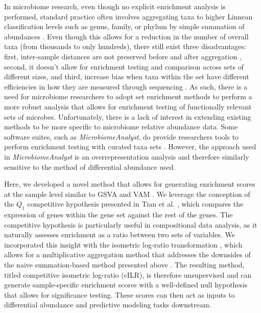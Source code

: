 \documentclass{article}
\begin{document}
In microbiome research, even though no explicit enrichment analysis is performed, standard practice often involves aggregating taxa to higher Linnean classification levels such as genus, family, or phylum by simple summation of abundances \cite{mclaren2019}. Even though this allows for a reduction in the number of overall taxa (from thousands to only hundreds), there still exist three disadvantages: first, inter-sample distances are not preserved before and after aggregation \cite{egozcue2005}, second, it doesn't allow for enrichment testing and comparison across sets of different sizes, and third, increase bias when taxa within the set have different efficiencies in how they are measured through sequencing \cite{mclaren2019}. As such, there is a need for microbiome researchers to adopt set enrichment methods to perform a more robust analysis that allows for enrichment testing of functionally relevant sets of microbes. Unfortunately, there is a lack of interest in extending existing methods to be more specific to microbiome relative abundance data. Some software suites, such as \emph{MicrobiomeAnalyst}, do provide researchers tools to perform enrichment testing with curated taxa sets \cite{chong2020}. However, the approach used in \emph{MicrobiomeAnalyst} is an overrepresentation analysis and therefore similarly sensitive to the method of differential abundance used. 

Here, we developed a novel method that allows for generating enrichment scores at the sample level similar to GSVA \cite{hanzelmann2013} and VAM \cite{frost2020a}. We leverage the conception of the $Q_1$ competitive hypothesis presented in Tian et al. \cite{tian2005}, which compares the expression of genes within the gene set against the rest of the genes. The competitive hypothesis is particularly useful in compositional data analysis, as it naturally assesses enrichment as a ratio between two sets of variables. We incorporated this insight with the isometric log-ratio transformation \cite{egozcue2003}, which allows for a multiplicative aggregation method that addresses the downsides of the naive summation-based method presented above \cite{mclaren2019, silverman2017}. The resulting method, titled competitive isometric log-ratio (cILR), is therefore unsupervised and can generate sample-specific enrichment scores with a well-defined null hypothesis that allows for significance testing. These scores can then act as inputs to differential abundance and predictive modeling tasks downstream. 
\end{document}
